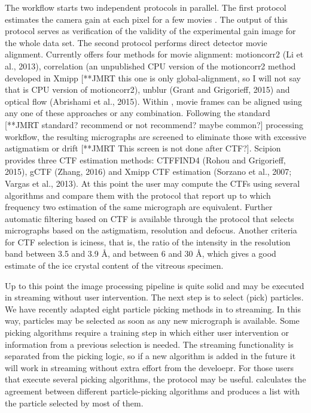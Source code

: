 The workflow starts two independent protocols in parallel. The first protocol estimates the camera gain at each pixel for a few  movies \citep{sorzano2018}. %
The output of this protocol serves as verification of the validity of the experimental gain image for the whole data set. The second protocol performs direct detector movie alignment. Currently \scipion offers  four  methods for movie alignment: motioncorr2 (Li et al., 2013), correlation (an unpublished CPU version of the motioncorr2 method developed in Xmipp [**JMRT this one is only global-alignment, so I will not say that is CPU version of motioncorr2), unblur (Grant and Grigorieff, 2015) and optical flow (Abrishami et al., 2015). Within \scipion, movie frames can be aligned using any one of these approaches or any combination. Following the standard [**JMRT standard? recommend or not recommend? maybe common?] processing workflow, the resulting micrographs are screened to eliminate those with excessive astigmatism or drift [**JMRT This screen is not done after CTF?]. Scipion provides three CTF estimation methods:
CTFFIND4 (Rohou and Grigorieff, 2015), gCTF (Zhang, 2016) and Xmipp CTF estimation (Sorzano et al., 2007; Vargas et al., 2013). At this point the user may compute the CTFs using several algorithms and compare them with the protocol  that report up to which frequency two estimation of the same micrograph are equivalent. Further automatic filtering based on CTF is available through the protocol  that selects micrographs based on the astigmatism, resolution and defocus. Another criteria for CTF selection is iciness, that is,  the ratio of the intensity in the resolution band between 3.5 and 3.9 \AA, and between 6 and 30 \AA, which gives a good estimate of the ice crystal content of the vitreous specimen.

Up to this point the image processing pipeline is quite solid and may be executed in streaming without user intervention. The next step is to select (pick) particles. We have recently adapted eight particle picking methods in \scipion  to streaming. In this way,  particles may be selected as soon as any new micrograph is available. Some picking algorithms require a training step in which either user intervention or information from a previous selection is needed. The streaming functionality is separated from the picking logic, so if a new algorithm is added in the future it will work in streaming without extra effort from the develoepr. For those users that execute several picking algorithms, the protocol  may be useful.   calculates the agreement between different particle-picking algorithms and produces a list with the particle selected by most of them.

